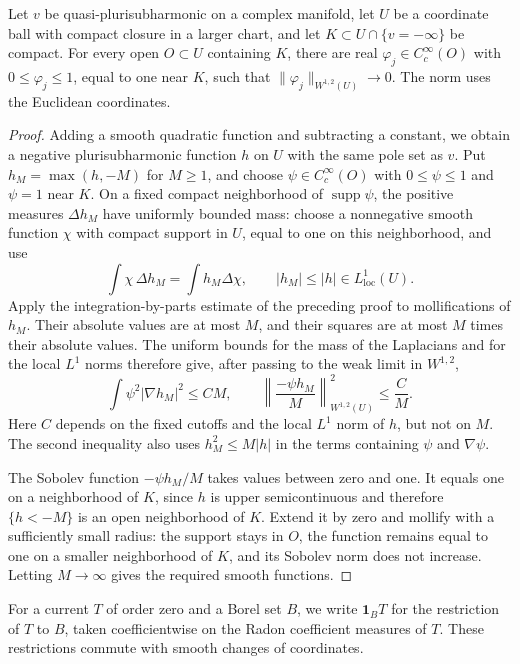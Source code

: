 \begin{lemma}\label{lem:pole-small-energy-tests}
Let $v$ be quasi-plurisubharmonic on a complex manifold, let $U$ be a coordinate ball with compact closure in a larger chart, and let $K\subset U\cap\{v=-\infty\}$ be compact. For every open $O\subset U$ containing $K$, there are real $\varphi_j\in C^\infty_c(O)$ with $0\leq\varphi_j\leq1$, equal to one near $K$, such that $\|\varphi_j\|_{W^{1,2}(U)}\to0$. The norm uses the Euclidean coordinates.
\end{lemma}
\begin{proof}
Adding a smooth quadratic function and subtracting a constant, we obtain a negative plurisubharmonic function $h$ on $U$ with the same pole set as $v$. Put $h_M=\max(h,-M)$ for $M\geq1$, and choose $\psi\in C^\infty_c(O)$ with $0\leq\psi\leq1$ and $\psi=1$ near $K$. On a fixed compact neighborhood of $\operatorname{supp}\psi$, the positive measures $\Delta h_M$ have uniformly bounded mass: choose a nonnegative smooth function $\chi$ with compact support in $U$, equal to one on this neighborhood, and use
\[
 \int\chi\,\Delta h_M=\int h_M\Delta\chi,
 \qquad |h_M|\leq|h|\in L^1_{\mathrm{loc}}(U).
\]
Apply the integration-by-parts estimate of the preceding proof to mollifications of $h_M$. Their absolute values are at most $M$, and their squares are at most $M$ times their absolute values. The uniform bounds for the mass of the Laplacians and for the local $L^1$ norms therefore give, after passing to the weak limit in $W^{1,2}$,
\[
 \int\psi^2|\nabla h_M|^2\leq CM,
 \qquad
 \left\|\frac{-\psi h_M}{M}\right\|_{W^{1,2}(U)}^2\leq\frac{C}{M}.
\]
Here $C$ depends on the fixed cutoffs and the local $L^1$ norm of $h$, but not on $M$. The second inequality also uses $h_M^2\leq M|h|$ in the terms containing $\psi$ and $\nabla\psi$.

The Sobolev function $-\psi h_M/M$ takes values between zero and one. It equals one on a neighborhood of $K$, since $h$ is upper semicontinuous and therefore $\{h<-M\}$ is an open neighborhood of $K$. Extend it by zero and mollify with a sufficiently small radius: the support stays in $O$, the function remains equal to one on a smaller neighborhood of $K$, and its Sobolev norm does not increase. Letting $M\to\infty$ gives the required smooth functions.
\end{proof}

For a current $T$ of order zero and a Borel set $B$, we write $\mathbf1_BT$ for the restriction of $T$ to $B$, taken coefficientwise on the Radon coefficient measures of $T$. These restrictions commute with smooth changes of coordinates.

